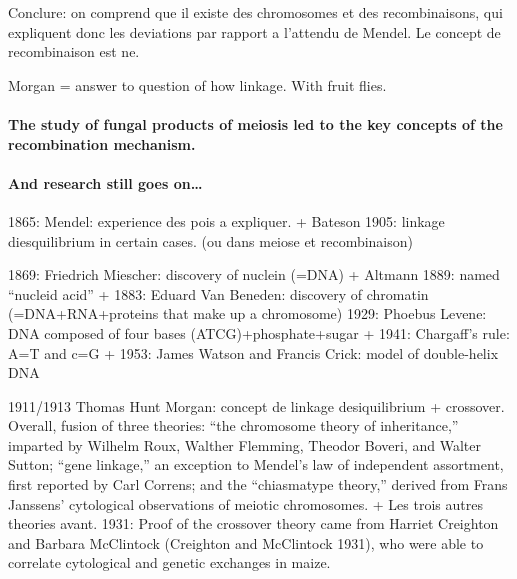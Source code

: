 

Conclure: on comprend que il existe des chromosomes et des recombinaisons, qui expliquent donc les deviations par rapport a l'attendu de Mendel. Le concept de recombinaison est ne.

Morgan = answer to question of how linkage. With fruit flies. 


\paragraph{The study of fungal products of meiosis led to the key concepts of the recombination mechanism.}





\paragraph{And research still goes on…}







1865: Mendel: experience des pois a expliquer.
+ Bateson 1905: linkage diesquilibrium in certain cases. (ou dans meiose et recombinaison)

1869: Friedrich Miescher: discovery of nuclein (=DNA) + Altmann 1889: named “nucleid acid”
+ 1883: Eduard Van Beneden: discovery of chromatin (=DNA+RNA+proteins that make up a chromosome)
1929: Phoebus Levene: DNA composed of four bases (ATCG)+phosphate+sugar
+ 1941: Chargaff's rule: A=T and c=G
+ 1953: James Watson and Francis Crick: model of double-helix DNA

1911/1913 Thomas Hunt Morgan: concept de linkage desiquilibrium + crossover. Overall, fusion of three theories: “the chromosome theory of inheritance,” imparted by Wilhelm Roux, Walther Flemming, Theodor Boveri, and Walter Sutton; “gene linkage,” an exception to Mendel’s law of independent assortment, first reported by Carl Correns; and the “chiasmatype theory,” derived from Frans Janssens' cytological observations of meiotic chromosomes.
+ Les trois autres theories avant. 
1931: Proof of the crossover theory came from Harriet Creighton and Barbara McClintock (Creighton and McClintock 1931), who were able to correlate cytological and genetic exchanges in maize.

